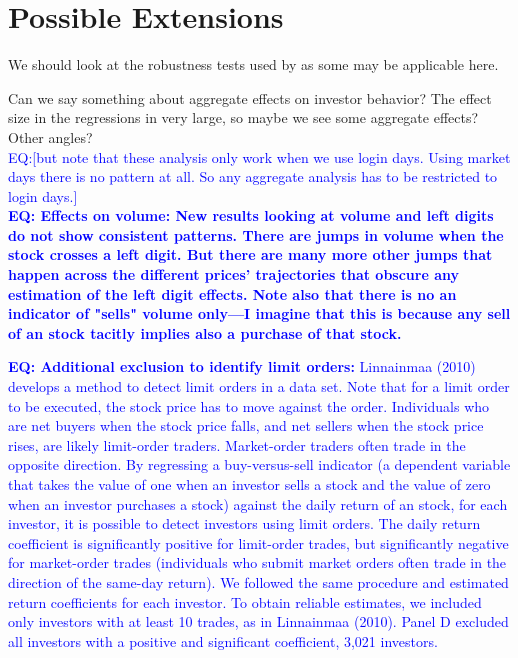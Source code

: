 \section{Possible Extensions}

We should look at the robustness tests used by \cite{hartzmark2015} as some may be applicable here.

Can we say something about aggregate effects on investor behavior? The effect size in the regressions in very large, so maybe we see some aggregate effects? Other angles? \\

 \textcolor{blue}{EQ:[but note that these analysis only work when we use login days. Using market days there is no pattern at all. So any aggregate analysis has to be restricted to login days.] \\
\textbf{EQ: Effects on volume: New results looking at volume and left digits do not show consistent patterns. There are jumps in volume when the stock crosses a left digit. But there are many more other jumps that happen across the different prices' trajectories that obscure any estimation of the left digit effects. Note also that there is no an indicator of "sells" volume only---I imagine that this is because any sell of an stock tacitly  implies also a purchase of that stock.}}


\textcolor{blue}{\textbf{EQ: Additional exclusion to identify limit orders:} Linnainmaa (2010) develops a method to detect limit orders in a data set. Note that for a limit order to be executed, the stock price has to move against the order. Individuals who are net buyers when the stock price falls, and net sellers when the stock price rises, are likely limit-order traders. Market-order traders often trade in the opposite direction. By regressing a buy-versus-sell indicator (a dependent variable that takes the value of one when an investor sells a stock and the value of zero when an investor purchases a stock) against the daily return of an stock, for each investor, it is possible to detect investors using limit orders. The daily return coefficient is significantly positive for limit-order trades, but significantly negative for market-order trades (individuals who submit market orders often trade in the direction of the same-day return). We followed the same procedure and estimated return coefficients for each investor. To obtain reliable estimates, we included only investors with at least 10 trades, as in Linnainmaa (2010). Panel D excluded all investors with a positive and significant coefficient, 3,021 investors.}
